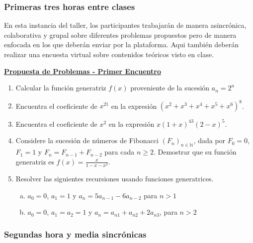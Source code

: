 \subsubsection{Primeras tres horas entre clases}\label{07-primeras-tres-horas-entre-clases}

En esta instancia del taller, los participantes trabajarán de manera asincrónica, colaborativa y grupal sobre diferentes problemas propuestos pero de manera enfocada en los que deberán enviar por la plataforma. Aqui también deberán realizar una encuesta virtual sobre contenidos teóricos visto en clase.

\bigskip
\begin{center}
	\begin{minipage}{0.8\linewidth}
		\begin{center}
			\underline{\textbf{Propuesta de Problemas - Primer Encuentro}}
		\end{center}
		
		\begin{enumerate}
			\item Calcular la función generatriz $f(x)$ proveniente de la sucesión $a_n = 2^n$
			\item Encuentra el coeficiente de $x^{21}$ en la expresión $(x^2 + x^3 + x^4 + x^5 + x^6)^8$.
			\item Encuentra el coeficiente de $x^2$ en la expresión $x (1 + x)^43 (2 - x)^5$.
			\item Considere la sucesión de números de Fibonacci $(F_n)_{n \in \mathbb{N}}$, dada por $F_0 = 0$, $F_1 = 1$ y $F_n = F_{n-1} + F_{n-2}$ para cada $n \ge 2$. Demostrar que su función generatriz es $f(x) = \frac{x}{1 - x - x^2}$.
			\item Resolver las siguientes recursiones usando funciones generatrices.
			\begin{enumerate}[a)]
				\item $a_0 = 0$, $a_1 = 1$ y $a_n = 5 a_{n-1} - 6 a_{n-2}$ para $n > 1$
				\item $a_0 = 0$, $a_1 = a_2 = 1$ y $a_n = a_{n1} + a_{n2} + 2 a_{n3}$, para $n > 2$
			\end{enumerate}
		\end{enumerate}
	\end{minipage}
\end{center}
\bigskip

\subsubsection{Segundas hora y media sincrónicas}

